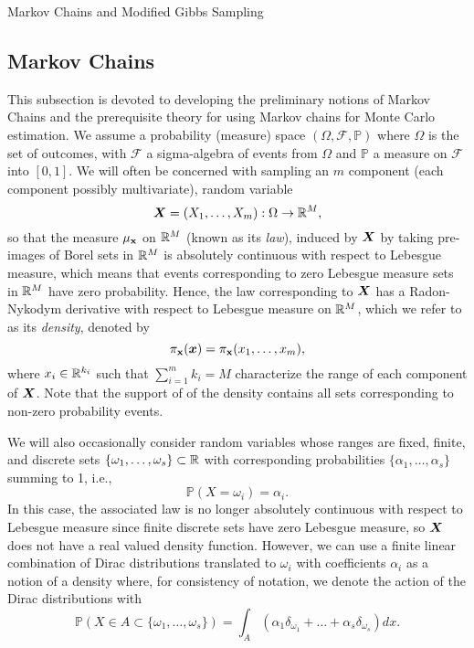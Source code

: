 \begin{chapter}{Markov Chains and Modified Gibbs Sampling}
  \subsection{Markov Chains}
This subsection is devoted to developing the preliminary notions of Markov Chains and the prerequisite theory for using Markov chains for Monte Carlo estimation. 
We assume a probability (measure) space $(\Omega,\mathcal F,\mathbb P)$ where $\Omega$ is the set of outcomes, with $\mathcal F$ a sigma-algebra of events from $\Omega$ and $\mathbb P$ a measure on $\mathcal F$ into $[0,1]$.
We will often be concerned with sampling an $m$ component (each component possibly multivariate), random variable 
\begin{equation}
\mbox{\boldmath$X$} = (X_1,\dots,X_m):\Omega \to \mathbb R^M,
\end{equation} 
  so that the measure $\mu_{\textsc{\bf{x}}}$ on $\mathbb R^M$ (known as its \emph{law}), induced by $\mbox{\boldmath$X$}$ by taking pre-images of Borel sets in $\mathbb R^M$ is absolutely continuous with respect to Lebesgue measure, which means that events corresponding to zero Lebesgue measure sets in $\mathbb R^M$ have zero probability.
Hence, the law corresponding to $\mbox{\boldmath$X$}$ has a Radon-Nykodym derivative with respect to Lebesgue measure on $\mathbb R^M$, which we refer to as its \emph{density}, denoted by 
\begin{equation}
  \pi_{\textsc{\bf{x}}}(\mbox{\boldmath$x$}) = \pi_{\textsc{\bf{x}}}(x_1,\dots,x_m),
\end{equation} where $x_i \in \mathbb R^{k_i}$ such that $\sum_{i=1}^m k_i = M$ characterize the range of each component of $\mbox{\boldmath$X$}$.
Note that the support of of the density contains all sets corresponding to non-zero probability events.

We will also occasionally consider random variables whose ranges are fixed, finite, and discrete sets $\{\omega_1,\dots,\omega_s\} \subset \mathbb R$ with corresponding probabilities $\{\alpha_1,\dots,\alpha_s\}$ summing to 1, i.e.,
\begin{equation} 
  \mathbb P( X = \omega_i ) = \alpha_i.
\end{equation}
In this case, the associated law is no longer absolutely continuous with respect to Lebesgue measure since finite discrete sets have zero Lebesgue measure, so $\mbox{\boldmath$X$}$ does not have a real valued density function.
However, we can use a finite linear combination of Dirac distributions translated to $\omega_i$ with coefficients $\alpha_i$ as a notion of a density where, for consistency of notation, we denote the action of the Dirac distributions with
\begin{equation} \label{eq:diracMeasure}
  \mathbb P( X \in A \subset \{\omega_1,\dots,\omega_s\} ) =  \int_A \left(\alpha_1 \delta_{\omega_1}+\dots+\alpha_s \delta_{\omega_s}\right) dx.
\end{equation}


\end{chapter}
